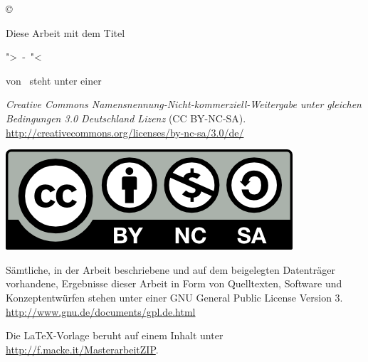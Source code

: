 \clearpage
\vspace*{\fill}



\begin{center}
	\copyright\ \jahr\ \autor \\
	
	\vspace*{15mm}
	
	Diese Arbeit mit dem Titel 
	
	">\titel\ -\ \untertitel"< 
	
	von \autor\ steht unter einer
	
	\textit{Creative Commons Namensnennung-Nicht-kommerziell-Weitergabe unter gleichen Bedingungen 3.0 Deutschland Lizenz} (CC BY-NC-SA). \linebreak
	\url{http://creativecommons.org/licenses/by-nc-sa/3.0/de/}
	
	\includegraphics[scale=0.9]{images/CC_BY-NC-SA}
	
	\vspace*{15mm}
	
	Sämtliche, in der Arbeit beschriebene und auf dem beigelegten Datenträger vorhandene, Ergebnisse dieser Arbeit in Form von Quelltexten, Software und Konzeptentwürfen stehen unter einer GNU General Public License Version 3.\linebreak
	\url{http://www.gnu.de/documents/gpl.de.html}
	
	\vspace*{15mm}
	
	Die LaTeX-Vorlage beruht auf einem Inhalt unter \url{http://f.macke.it/MasterarbeitZIP}.

\end{center}


\vspace*{\fill}
\clearpage